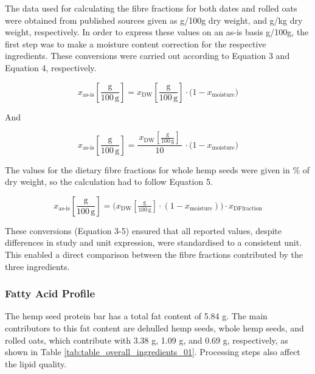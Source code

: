 \vspace{1em}
The data used for calculating the fibre fractions for both dates and rolled oats were obtained from published sources given as g/100g dry weight, and g/kg dry weight, respectively. In order to express these values on an as-is basis g/100g, the first step was to make a moisture content correction for the respective ingredients. These conversions were carried out according to Equation 3 and Equation 4, respectively. 


\begin{equation}
    x_{\text{as-is}}\!\left[\frac{\mathrm{g}}{100\,\mathrm{g}}\right]
    = x_{\mathrm{DW}}\!\left[\frac{\mathrm{g}}{100\,\mathrm{g}}\right]\cdot
    \bigl(1 - x_{\text{moisture}}\bigr)
    \label{eq:asis_simple}
\end{equation}

And

\begin{equation}
    x_{\text{as-is}}\!\left[\frac{\mathrm{g}}{100\,\mathrm{g}}\right]
    = \frac{\,x_{\mathrm{DW}}\!\left[\frac{\mathrm{g}}{100\,\mathrm{g}}\right]\,}{10}\,\cdot
    \bigl(1 - x_{\text{moisture}}\bigr)
    \label{eq:asis_div10}
\end{equation}
    
The values for the dietary fibre fractions for whole hemp seeds were given in \% of dry weight, so the calculation had to follow Equation 5.     

\begin{equation}
    x_{\text{as-is}}\!\left[\frac{\mathrm{g}}{100\,\mathrm{g}}\right]
    = \bigl( x_{\mathrm{DW}}\!\left[\tfrac{\mathrm{g}}{100\,\mathrm{g}}\right]
    \cdot (1 - x_{\text{moisture}}) \bigr)
    \cdot x_{\text{DFfraction}}
    \label{eq:asis_dffraction}
\end{equation}

These conversions (Equation 3-5) ensured that all reported values, despite differences in study and unit expression, were standardised to a consistent unit. This enabled a direct comparison between the fibre fractions contributed by the three ingredients. 

\subsubsection{Fatty Acid Profile}
The hemp seed protein bar has a total fat content of 5.84 g. The main contributors to this fat content
are dehulled hemp seeds, whole hemp seeds, and rolled oats, which contribute with 3.38 g, 1.09 g,
and 0.69 g, respectively, as shown in Table \ref*{tab:table_overall_ingredients_01}. Processing steps also affect the lipid quality.


